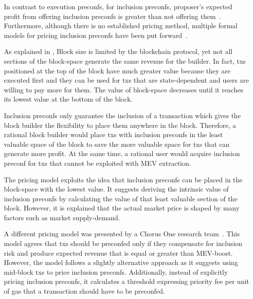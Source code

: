 \documentclass[a4paper]{article}
\theoremstyle{boldstyle}
\begin{document}
    In contrast to execution preconfs, for inclusion preconfs, proposer's expected profit from offering inclusion preconfs is greater than not offering them~\cite{W:AnalysingExpectedProposerRevenuefromPreconfirmations}. Furthermore, although there is no established pricing method, multiple formal models for pricing inclusion preconfs have been put forward~\cite{W:APricingModelforInclusionPreconfirmations,W:PricingTransactionsforPreconfirmation}.

    As explained in \cite{W:APricingModelforInclusionPreconfirmations}, Block size is limited by the blockchain protocol, yet not all sections of the block-space generate the same revenue for the builder. In fact, txs positioned at the top of the block have much greater value because they are executed first and they can be used for txs that are state-dependent and users are willing to pay more for them. The value of block-space decreases until it reaches its lowest value at the bottom of the block.
    
    Inclusion preconfs only guarantee the inclusion of a transaction which gives the block builder the flexibility to place them anywhere in the block. Therefore, a rational block builder would place txs with inclusion preconfs in the least valuable space of the block to save the more valuable space for txs that can generate more profit. At the same time, a rational user would acquire inclusion preconf for txs that cannot be exploited with MEV extraction.

    The pricing model exploits the idea that inclusion preconfs can be placed in the block-space with the lowest value. It suggests deriving the intrinsic value of inclusion preconfs by calculating the value of that least valuable section of the block. However, it is explained that the actual market price is shaped by many factors such as market supply-demand.

    A different pricing model was presented by a Chorus One research team~\cite{W:PricingTransactionsforPreconfirmation}. This model agrees that txs should be preconfed only if they compensate for inclusion risk and produce expected revenue that is equal or greater than MEV-boost. However, the model follows a slightly alternative approach as it suggests using mid-block txs to price inclusion preconfs. Additionally, instead of explicitly pricing inclusion preconfs, it calculates a threshold expressing priority fee per unit of gas that a transaction should have to be preconfed.
\end{document}

